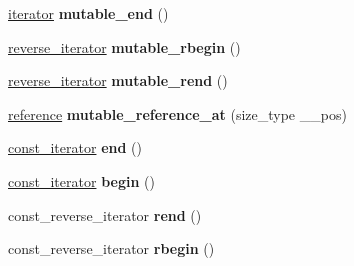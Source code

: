 \begin{DoxyCompactItemize}
\hyperlink{class___rope__iterator}{iterator} {\bfseries mutable\+\_\+end} ()
\item 
\mbox{\label{classrope_abd7586efb0196193d0118cc1be147e11}} 
\hyperlink{classreverse__iterator}{reverse\+\_\+iterator} {\bfseries mutable\+\_\+rbegin} ()
\item 
\mbox{\label{classrope_ae52060385b708c72f9e5483da86670ba}} 
\hyperlink{classreverse__iterator}{reverse\+\_\+iterator} {\bfseries mutable\+\_\+rend} ()
\item 
\mbox{\label{classrope_ac8518bb022a5dbff7120b9d5ab22fbd4}} 
\hyperlink{class___rope__char__ref__proxy}{reference} {\bfseries mutable\+\_\+reference\+\_\+at} (size\+\_\+type \+\_\+\+\_\+pos)
\item 
\mbox{\label{classrope_a839ea7f76b6d47bf8c6d5b11c4eaa791}} 
\hyperlink{class___rope__const__iterator}{const\+\_\+iterator} {\bfseries end} ()
\item 
\mbox{\label{classrope_a3535935d7bc144474122d513fe484f63}} 
\hyperlink{class___rope__const__iterator}{const\+\_\+iterator} {\bfseries begin} ()
\item 
\mbox{\label{classrope_adcf4c7c9d47df26a5d12e0e3e274f214}} 
const\+\_\+reverse\+\_\+iterator {\bfseries rend} ()
\item 
\mbox{\label{classrope_ad40b653ed290a67d032201d185d50115}} 
const\+\_\+reverse\+\_\+iterator {\bfseries rbegin} ()
\end{DoxyCompactItemize}
